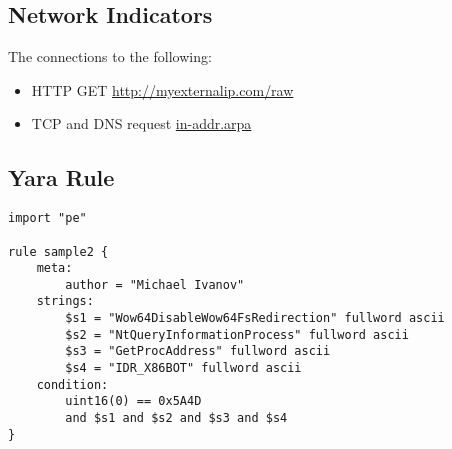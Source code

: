 \documentclass{article}
\begin{document}
    \subsection{Network Indicators}
    The connections to the following:
    \begin{itemize}
        \item HTTP GET \url{http://myexternalip.com/raw}
        \item TCP and DNS request \url{in-addr.arpa}
    \end{itemize}
    \subsection{Yara Rule}
    \begin{verbatim}
import "pe"

rule sample2 {
    meta:
        author = "Michael Ivanov"
    strings:
        $s1 = "Wow64DisableWow64FsRedirection" fullword ascii
        $s2 = "NtQueryInformationProcess" fullword ascii
        $s3 = "GetProcAddress" fullword ascii
        $s4 = "IDR_X86BOT" fullword ascii
    condition:
        uint16(0) == 0x5A4D
        and $s1 and $s2 and $s3 and $s4
}
    \end{verbatim}
    \pagebreak
    \printbibliography
\end{document}
